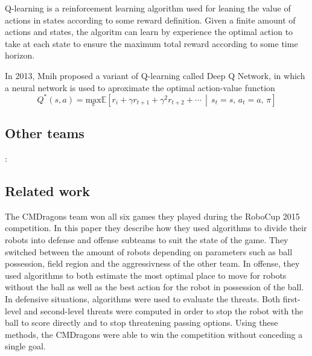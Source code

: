 Q-learning is a reinforcement learning algorithm used for leaning the value of actions in states according to some reward definition. Given a finite amount of actions and states, the algoritm can learn by experience the optimal action to take at each state to ensure the maximum total reward according to some time horizon.

In 2013, Mnih\cite{DQN} proposed a variant of Q-learning called Deep Q Network, in which a neural network is used to aproximate the optimal action-value function
\begin{equation}
    Q^*(s,a)=\underset \pi {\text{max}} \mathbb{E}\left[ r_i+\gamma r_{t+1}+\gamma^2 r_{t+2}+\cdots \,\middle|\, s_t=s,\,a_t=a,\,\pi \right]
\end{equation}

\subsection{Other teams}:
\subsection{Related work}
The CMDragons\cite{CMDragons2015} team won all six games they played during the RoboCup 2015 competition. In this paper they describe how they used algorithms to divide their robots into defense and offense subteams to suit the state of the game. They switched between the amount of robots depending on parameters such as ball possession, field region and the aggressivness of the other team. In offense, they used algorithms to both estimate the most optimal place to move for robots without the ball as well as the best action for the robot in possession of the ball. In defensive situations, algorithms were used to evaluate the threats. Both first-level and second-level threats were computed in order to stop the robot with the ball to score directly and to stop threatening passing options. Using these methods, the CMDragons were able to win the competition without conceding a single goal.
